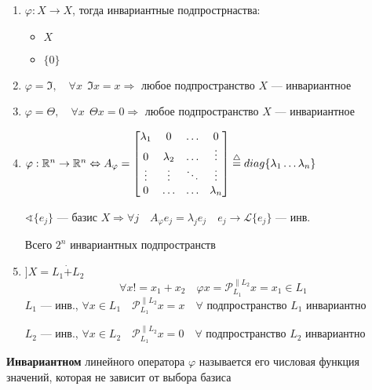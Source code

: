 \begin{example}
    \begin{enumerate}
        \item $\varphi : X\to X$, тогда инвариантные подпрострнаства:
        \begin{itemize}
            \item $X$
            \item $\{0\}$
        \end{itemize}
        \item $\varphi = \Im, \quad \forall x\ \ \Im x = x \Rightarrow$ любое подпространство $X$ --- инвариантное
        \item $\varphi = \Theta, \quad \forall x\ \ \Theta x = 0 \Rightarrow$ любое подпространство $X$ --- инвариантное
        \item $\varphi : \mathbb{R}^n \to \mathbb{R}^n \Leftrightarrow A_\varphi = \begin{bmatrix}
            \lambda_1 & 0 & \ldots & 0 \\
            0 & \lambda_2 & \ldots & \vdots \\
            \vdots & \vdots & \ddots & \vdots \\
            0 & \ldots & \ldots & \lambda_n
        \end{bmatrix}\stackrel{\triangle}{=} diag\{\lambda_1\ldots \lambda_n\}$

        $\sphericalangle \{e_j\}$ --- базис $X \Rightarrow \forall j \quad A_\varphi e_j=\lambda_j e_j \quad e_j\to \mathcal{L}\{e_j\}$ --- инв.

        Всего $2^n$ инвариантных подпространств

        \item $] X = L_1 \dot{+} L_2$
        $$\forall x!=x_1+x_2 \quad \varphi x = \mathcal{P}_{L_1}^{\parallel L_2} x = x_1\in L_1$$
        $L_1$ --- инв., $\forall x\in L_1 \quad \mathcal{P}_{L_1}^{\parallel L_2} x = x \quad \forall$ подпространство $L_1$ инвариантно

        $L_2$ --- инв., $\forall x\in L_2 \quad \mathcal{P}_{L_1}^{\parallel L_2} x = 0 \quad \forall$ подпространство $L_2$ инвариантно
    \end{enumerate}
\end{example}

\begin{definition}
    \textbf{Инвариантном} линейного оператора $\varphi$ называется его числовая функция значений, которая не зависит от выбора базиса
\end{definition}

